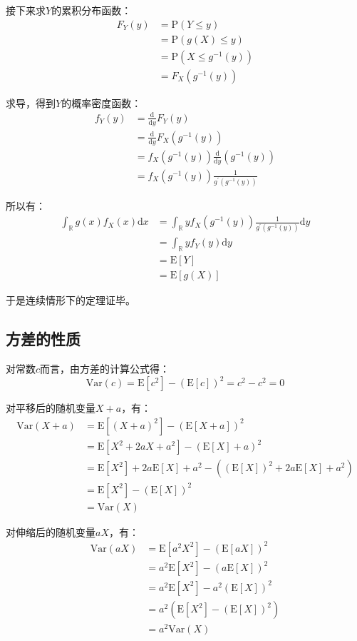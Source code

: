 \documentclass[UTF8]{ctexbook}
\begin{document}
接下来求$Y$的累积分布函数：
\begin{align*}
	F_Y(y)&=\mathrm P(Y\leq y) \\
	&=\mathrm P(g(X)\leq y) \\
	&=\mathrm P(X\leq g^{-1}(y)) \\
	&=F_X(g^{-1}(y))
\end{align*}

求导，得到$Y$的概率密度函数：
\begin{align*}
	f_Y(y)&=\frac{\mathrm d}{\mathrm dy}F_Y(y) \\
	&=\frac{\mathrm d}{\mathrm dy}F_X(g^{-1}(y)) \\
	&=f_X(g^{-1}(y))\frac{\mathrm d}{\mathrm dy}(g^{-1}(y)) \\
	&=f_X(g^{-1}(y))\frac{1}{g^{'}(g^{-1}(y))}
\end{align*}

所以有：
\begin{align*}
	\int_{\mathbb{R}}g(x)f_X(x)\mathrm dx&=\int_{\mathbb{R}}yf_X(g^{-1}(y))\frac{1}{g^{'}(g^{-1}(y))}\mathrm dy \\
	&=\int_{\mathbb{R}}yf_Y(y)\mathrm dy \\
	&=\mathrm E[Y] \\
	&=\mathrm E[g(X)]
\end{align*}

于是连续情形下的定理证毕。

\subsection{方差的性质}
\label{variance-proof}
对常数$c$而言，由方差的计算公式得：
\[
	\mathrm{Var}(c)=\mathrm E[c^2]-\left(\mathrm{E}[c]\right)^2=c^2-c^2=0
\]

对平移后的随机变量$X+a$，有：
\begin{align*}
	\mathrm{Var}(X+a)&=\mathrm E[(X+a)^2]-\left(\mathrm{E}[X+a]\right)^2 \\
	&=\mathrm E[X^2+2aX+a^2]-\left(\mathrm{E}[X]+a\right)^2 \\
	&=\mathrm E[X^2]+2a\mathrm E[X]+a^2-((\mathrm E[X])^2+2a\mathrm E[X]+a^2) \\
	&=\mathrm E[X^2]-(\mathrm E[X])^2 \\
	&=\mathrm{Var}(X)
\end{align*}

对伸缩后的随机变量$aX$，有：
\begin{align*}
	\mathrm{Var}(aX)&=\mathrm E[a^2X^2]-\left(\mathrm{E}[aX]\right)^2 \\
	&=a^2\mathrm E[X^2]-\left(a\mathrm{E}[X]\right)^2 \\
	&=a^2\mathrm E[X^2]-a^2\left(\mathrm{E}[X]\right)^2 \\
	&=a^2(\mathrm E[X^2]-(\mathrm E[X])^2) \\
	&=a^2\mathrm{Var}(X)
\end{align*}
\end{document}
